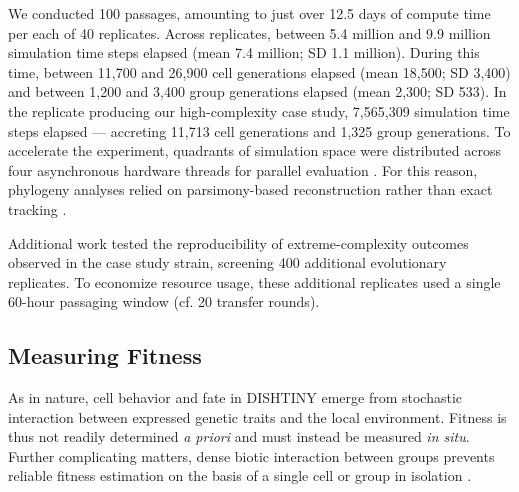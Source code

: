 
%

We conducted 100 passages, amounting to just over 12.5 days of compute time per each of 40 replicates.
Across replicates, between 5.4 million and 9.9 million simulation time steps elapsed (mean 7.4 million; SD 1.1 million).
During this time, between 11,700 and 26,900 cell generations elapsed (mean 18,500; SD 3,400) and between 1,200 and 3,400 group generations elapsed (mean 2,300; SD 533).
In the replicate producing our high-complexity case study, 7,565,309 simulation time steps elapsed --- accreting 11,713 cell generations and 1,325 group generations.
To accelerate the experiment, quadrants of simulation space were distributed across four asynchronous hardware threads for parallel evaluation \citep{moreno2021conduit}.
For this reason, phylogeny analyses relied on parsimony-based reconstruction rather than exact tracking \citep{moreno2022hereditary,moreno2026trust}.

Additional work tested the reproducibility of extreme-complexity outcomes observed in the case study strain, screening 400 additional evolutionary replicates.
To economize resource usage, these additional replicates used a single 60-hour passaging window (cf. 20 transfer rounds).

\subsection{Measuring Fitness}
\label{sec:measuringfitness}



As in nature, cell behavior and fate in DISHTINY emerge from stochastic interaction between expressed genetic traits and the local environment.
Fitness is thus not readily determined \textit{a priori} \citep{franklin2019mapping} and must instead be measured \textit{in situ}.
Further complicating matters, dense biotic interaction between groups prevents reliable fitness estimation on the basis of a single cell or group in isolation \citep{wadgymar2024defining}.

